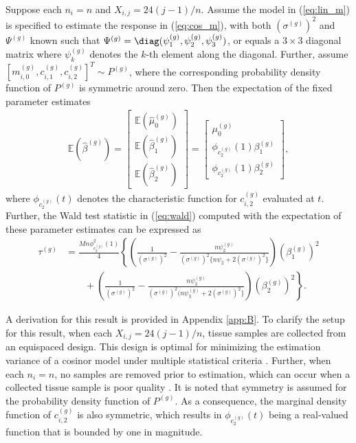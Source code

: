 \begin{prop} \label{prop:1}
Suppose each $n_i = n$ and $X_{i,j} = 24(j-1)/n$. Assume the model in (\ref{eq:lin_m}) is specified to estimate the response in (\ref{eq:cos_m}), with both $(\sigma^{(g)})^2$ and $\Psi^{(g)}$ known such that $\Psi^{(g)} = \diag(\psi^{(g)}_1, \psi^{(g)}_2, \psi^{(g)}_3)$, or equals a $3\times 3$ diagonal matrix where $\psi^{(g)}_k$ denotes the $k$-th element along the diagonal. Further, assume $[m_{i,0}^{(g)}, c^{(g)}_{i,1}, c^{(g)}_{i,2}]^T \sim P^{(g)}$, where the corresponding probability density function of $P^{(g)}$ is symmetric around zero. Then the expectation of the fixed parameter estimates
\begin{align*}
    \mathbb{E}(\hat{\beta}^{(g)}) = \begin{bmatrix}
    \mathbb{E}(\hat{\mu}^{(g)}_0) \\
    \mathbb{E}(\hat{\beta}^{(g)}_1) \\
    \mathbb{E}(\hat{\beta}^{(g)}_2)
    \end{bmatrix} = \begin{bmatrix}
    \mu^{(g)}_0 \\
    \phi_{c^{(g)}_2}(1)\beta^{(g)}_1 \\
    \phi_{c^{(g)}_2}(1)\beta^{(g)}_2
    \end{bmatrix},
\end{align*}
where $\phi_{c^{(g)}_2}(t)$ denotes the characteristic function for $c^{(g)}_{i,2}$ evaluated at $t$. Further, the Wald test statistic in (\ref{eq:wald}) computed with the expectation of these parameter estimates can be expressed as
\begin{align*}
    \tau^{(g)} 
    &= \frac{Mn\phi^2_{c^{(g)}_2}(1)}{4}\left\{\left(\frac{1}{(\sigma^{(g)})^2} - \frac{n\psi^{(g)}_2}{(\sigma^{(g)})^2\{n\psi_2+2(\sigma^{(g)})^2\}}\right)(\beta_1^{(g)})^2 \right. \\
    & \quad \quad + \left. \left(\frac{1}{(\sigma^{(g)})^2} - \frac{n\psi^{(g)}_3}{(\sigma^{(g)})^2(n\psi^{(g)}_3+2(\sigma^{(g)})^2\}}\right)(\beta^{(g)}_2)^2 \right\}.
\end{align*}
\end{prop}

\noindent A derivation for this result is provided in Appendix \ref{app:B}. To clarify the setup for this result, when each $X_{i,j} = 24(j-1)/n$, tissue samples are collected from an equispaced design. This design is optimal for minimizing the estimation variance of a cosinor model under multiple statistical criteria \citep[Pages 241-243]{Pukelsheim2006}. Further, when each $n_i = n$, no samples are removed prior to estimation, which can occur when a collected tissue sample is poor quality \citep{Laurie2010}. It is noted that symmetry is assumed for the probability density function of $P^{(g)}$. As a consequence, the marginal density function of $c^{(g)}_{i,2}$ is also symmetric, which results in $\phi_{c_2^{(g)}}(t)$ being a real-valued function that is bounded by one in magnitude.

